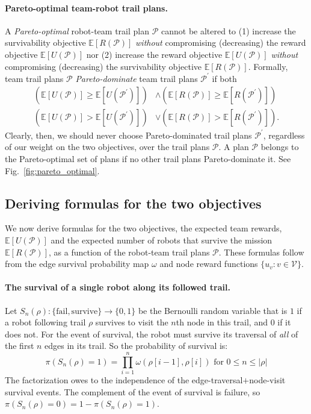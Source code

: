 \documentclass[11pt, oneside]{article}
\begin{document}
\paragraph{Pareto-optimal team-robot trail plans.} 
A \emph{Pareto-optimal} \cite{pardalos2017non} robot-team trail plan $\mathcal{P}$ cannot be altered to
(1) increase the survivability objective $\mathbb{E}[R(\mathcal{P})]$ \emph{without} compromising (decreasing) the reward objective $\mathbb{E}[U(\mathcal{P})]$
nor
(2) increase the reward objective $\mathbb{E}[U(\mathcal{P})]$ \emph{without} compromising (decreasing) the survivability objective $\mathbb{E}[R(\mathcal{P})]$.
Formally, team trail plans $\mathcal{P}$ \emph{Pareto-dominate} team trail plans  $\mathcal{P}^\prime$ if both
\begin{align}
	\left (\mathbb{E}[U(\mathcal{P})] \geq \mathbb{E}[U(\mathcal{P}^\prime)]  \right) & \wedge \left( \mathbb{E}[R(\mathcal{P})] \geq \mathbb{E}[R(\mathcal{P}^\prime)] \right) \\
	\left( \mathbb{E}[U(\mathcal{P})] > \mathbb{E}[U(\mathcal{P}^\prime)] \right) & \vee \left( \mathbb{E}[R(\mathcal{P})] > \mathbb{E}[R(\mathcal{P}^\prime)] \right).
\end{align}
Clearly, then, we should never choose Pareto-dominated trail plans $\mathcal{P}^\prime$, regardless of our weight on the two objectives, over the trail plans $\mathcal{P}$. A plan $\mathcal{P}$ belongs to the Pareto-optimal set of plans if no other trail plans Pareto-dominate it. 
See Fig.~\ref{fig:pareto_optimal}.

\subsection{Deriving formulas for the two objectives}
We now derive formulas for the two objectives, the expected team rewards, $\mathbb{E}[U(\mathcal{P})]$ and the expected number of robots that survive the mission $\mathbb{E}[R(\mathcal{P})]$, as a function of the robot-team trail plans $\mathcal{P}$. These formulas follow from the edge survival probability map $\omega$ and node reward functions $\{u_v : v \in \mathcal{V}\}$.

\paragraph{The survival of a single robot along its followed trail.}
Let $S_n(\rho) : \{\text{fail}, \text{survive}\} \rightarrow \{0, 1\} $ be the Bernoulli random variable that is $1$ if a robot following trail $\rho$ survives to visit the $n$th node in this trail, and $0$ if it does not. For the event of survival, the robot must survive its traversal of \emph{all} of the first $n$ edges in its trail. So the probability of survival is:
\begin{equation}
	\pi(S_n(\rho) = 1) = \prod_{i=1}^n \omega(\rho[i-1], \rho[i]) \text{ for } 0 \leq n \leq \lvert \rho \rvert %
	\label{eq:pi_S_n}
\end{equation} The factorization owes to the independence of the edge-traversal$+$node-visit survival events.
The complement of the event of survival is failure, so $\pi(S_n(\rho) = 0)=1-\pi(S_n(\rho) = 1)$.
\end{document}
